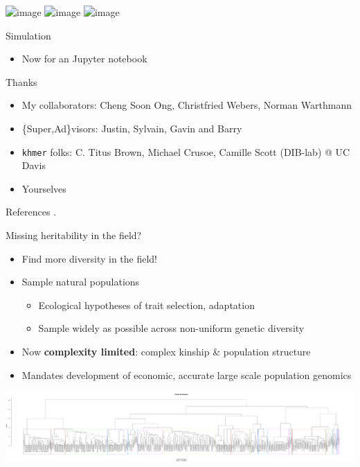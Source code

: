 \documentclass[t]{beamer}
\begin{document}
\begin{frame}
  \begin{center}
    \includegraphics<1>[width=0.6\textwidth]{img/true-mat.png}
    \includegraphics<2>[width=0.6\textwidth]{img/kwip-mat.png}
    \includegraphics<3>[width=0.6\textwidth]{img/ip-mat.png}
  \end{center}
\end{frame}

\begin{frame}{Simulation}
  \begin{itemize}
    \item Now for an Jupyter notebook
  \end{itemize}
\end{frame}

\begin{frame}{Thanks}
  \begin{itemize}
    \item My collaborators: Cheng Soon Ong, Christfried Webers, Norman Warthmann
    \item \{Super,Ad\}visors: Justin, Sylvain, Gavin and Barry
    \item \texttt{khmer} folks: C. Titus Brown, Michael Crusoe, Camille Scott (DIB-lab) @ UC Davis
    \item Yourselves
  \end{itemize}
\end{frame}

\begin{frame}[shrink=20]{References}
  \printbibliography
  \vfill
  .
\end{frame}


\begin{frame}{Missing heritability in the field?}
  \begin{itemize}
    \item Find more diversity in the field!
    \item Sample natural populations
      \begin{itemize}
        \item Ecological hypotheses of trait selection, adaptation
        \item Sample widely as possible across non-uniform genetic diversity
      \end{itemize}
      \pause
    \item Now \textbf{complexity limited}: complex kinship \& population
      structure
    \item Mandates development of economic, accurate large scale population
      genomics
  \end{itemize}
  \begin{center}
    \includegraphics[width=\textwidth]{img/jared-tree.pdf}
  \end{center}
\end{frame}
\end{document}
